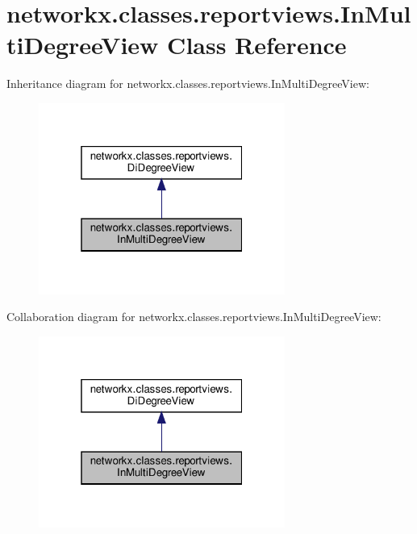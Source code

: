 \hypertarget{classnetworkx_1_1classes_1_1reportviews_1_1InMultiDegreeView}{}\section{networkx.\+classes.\+reportviews.\+In\+Multi\+Degree\+View Class Reference}
\label{classnetworkx_1_1classes_1_1reportviews_1_1InMultiDegreeView}


Inheritance diagram for networkx.\+classes.\+reportviews.\+In\+Multi\+Degree\+View\+:
\nopagebreak
\begin{figure}[H]
\begin{center}
\leavevmode
\includegraphics[width=229pt]{classnetworkx_1_1classes_1_1reportviews_1_1InMultiDegreeView__inherit__graph}
\end{center}
\end{figure}


Collaboration diagram for networkx.\+classes.\+reportviews.\+In\+Multi\+Degree\+View\+:
\nopagebreak
\begin{figure}[H]
\begin{center}
\leavevmode
\includegraphics[width=229pt]{classnetworkx_1_1classes_1_1reportviews_1_1InMultiDegreeView__coll__graph}
\end{center}
\end{figure}
